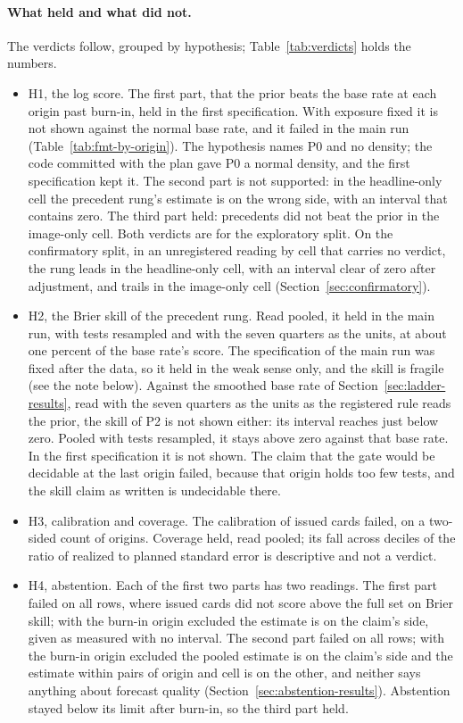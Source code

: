 \paragraph{What held and what did not.} The verdicts follow, grouped by hypothesis; Table~\ref{tab:verdicts} holds the numbers.
\begin{itemize}
\item H1, the log score. The first part, that the prior beats the base rate at each origin past burn-in, held in the first specification. With exposure fixed it is not shown against the normal base rate, and it failed in the main run (Table~\ref{tab:fmt-by-origin}). The hypothesis names P0 and no density; the code committed with the plan gave P0 a normal density, and the first specification kept it. The second part is not supported: in the headline-only cell the precedent rung's estimate is on the wrong side, with an interval that contains zero. The third part held: precedents did not beat the prior in the image-only cell. Both verdicts are for the exploratory split. On the confirmatory split, in an unregistered reading by cell that carries no verdict, the rung leads in the headline-only cell, with an interval clear of zero after adjustment, and trails in the image-only cell (Section~\ref{sec:confirmatory}).
\item H2, the Brier skill of the precedent rung. Read pooled, it held in the main run, with tests resampled and with the seven quarters as the units, at about one percent of the base rate's score. The specification of the main run was fixed after the data, so it held in the weak sense only, and the skill is fragile (see the note below). Against the smoothed base rate of Section~\ref{sec:ladder-results}, read with the seven quarters as the units as the registered rule reads the prior, the skill of P2 is not shown either: its interval reaches just below zero. Pooled with tests resampled, it stays above zero against that base rate. In the first specification it is not shown. The claim that the gate would be decidable at the last origin failed, because that origin holds too few tests, and the skill claim as written is undecidable there.
\item H3, calibration and coverage. The calibration of issued cards failed, on a two-sided count of origins. Coverage held, read pooled; its fall across deciles of the ratio of realized to planned standard error is descriptive and not a verdict.
\item H4, abstention. Each of the first two parts has two readings. The first part failed on all rows, where issued cards did not score above the full set on Brier skill; with the burn-in origin excluded the estimate is on the claim's side, given as measured with no interval. The second part failed on all rows; with the burn-in origin excluded the pooled estimate is on the claim's side and the estimate within pairs of origin and cell is on the other, and neither says anything about forecast quality (Section~\ref{sec:abstention-results}). Abstention stayed below its limit after burn-in, so the third part held.

\end{itemize}
